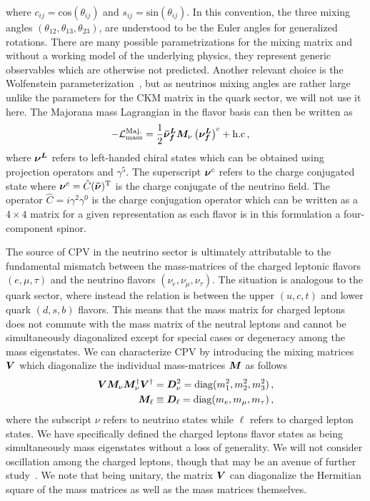 where $c_{ij} = \mathrm{cos}(\theta_{ij})$ and $s_{ij} = \mathrm{sin}(\theta_{ij})$. In this convention, the three mixing angles $(\theta_{12}, \theta_{13}, \theta_{23})$, are understood to be the Euler angles for generalized rotations. There are many possible parametrizations for the mixing matrix and without a working model of the underlying physics, they represent generic observables which are otherwise not predicted. Another relevant choice is the Wolfenstein parameterization~\citep{wolfenstein1983parametrization}, but as neutrinos mixing angles are rather large unlike the parameters for the CKM matrix in the quark sector, we will not use it here. The Majorana mass Lagrangian in the flavor basis can then be written as
\begin{alignat}{1}
	\label{mass:1} -\mathcal{L}_{\mathrm{mass}}^{\mathrm{Maj.}}&=\frac{1}{2}\boldsymbol{\bar{\nu}_{f}^{L}}\boldsymbol{M}_{\nu}\left(\boldsymbol{\nu_{f}^{L}}\right)^{c}+\mathrm{h.c}\,,
\end{alignat}
where $\boldsymbol{\nu^{L}}$ refers to left-handed chiral states which can be obtained using projection operators and $\gamma^{5}$. The superscript $\boldsymbol{\nu}^{c}$ refers to the charge conjugated state where $\boldsymbol{\nu}^{c} = \hat{C}(\boldsymbol{\bar{\nu}})^{\mathrm T}$ is the charge conjugate of the neutrino field. The operator $\hat{C} = i\gamma^{2}\gamma^{0}$ is the charge conjugation operator which can be written as a $4\times4$ matrix for a given representation as each flavor is in this formulation a four-component spinor.

The source of CPV in the neutrino sector is ultimately attributable to the fundamental mismatch between the mass-matrices of the charged leptonic flavors $(e,\mu,\tau)$ and the neutrino flavors $(\nu_{e},\nu_{\mu},\nu_{\tau})$. The situation is analogous to the quark sector, where instead the relation is between the upper $(u,c,t)$ and lower quark $(d,s,b)$ flavors. This means that the mass matrix for charged leptons does not commute with the mass matrix of the neutral leptons and cannot be simultaneously diagonalized except for special cases or degeneracy among the mass eigenstates. We can characterize CPV by introducing the mixing matrices $\boldsymbol{V}$ which diagonalize the individual mass-matrices $\boldsymbol{M}$ as follows
\begin{alignat}{1}
	\label{diag:1} \boldsymbol{V}\boldsymbol{M}_{\nu}\boldsymbol{M}_{\nu}^{\dagger}\boldsymbol{V}^{\dagger} = \boldsymbol{D}_{\nu}^{2} = \mathrm{diag}(m_{1}^{2},m_{2}^{2},m_{3}^{2})\,,\\
    \label{diag:2} \boldsymbol{M}_{\ell} \equiv \boldsymbol{D}_{\ell} = \mathrm{diag}(m_{e},m_{\mu},m_{\tau})\,,
\end{alignat}
where the subscript $\nu$ refers to neutrino states while $\ell$ refers to charged lepton states. We have specifically defined the charged leptons flavor states as being simultaneously mass eigenstates without a loss of generality. We will not consider oscillation among the charged leptons, though that may be an avenue of further study~\citep{akhmedov2007charged}. We note that being unitary, the matrix $\boldsymbol{V}$ can diagonalize the Hermitian square of the mass matrices as well as the mass matrices themselves.

